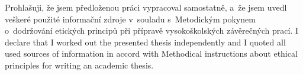 \startDeclaration
\ifCzech
  Prohlašuji, že jsem předloženou práci vypracoval samostatně,
  a~že jsem uvedl veškeré použité informační zdroje v~souladu
  s~Metodickým pokynem o~dodržování etických principů při přípravě
  vysokoškolských závěrečných prací.
\fi
\ifEnglish
  I declare that I worked out the presented thesis independently
  and I quoted all used sources of information in accord with
  Methodical instructions about ethical principles for writing an
  academic thesis.
\fi
\stopDeclaration

\endinput
